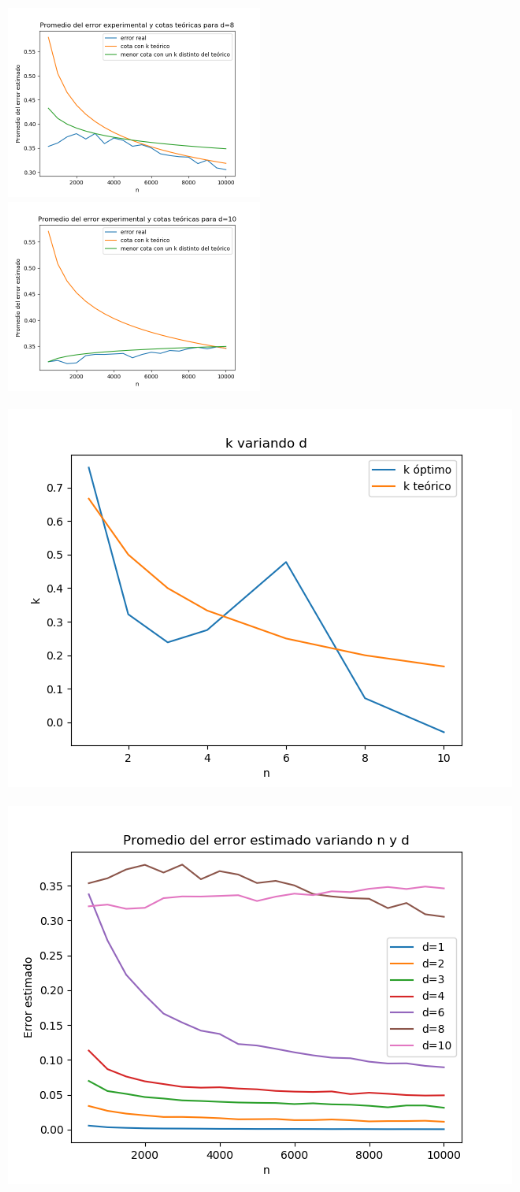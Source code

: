 \documentclass[12pt, a4paper]{article}
\begin{document}
\includegraphics[width=0.5\textwidth]{figuras_h_dinamico/cotas-error-d=8}
\includegraphics[width=0.5\textwidth]{figuras_h_dinamico/cotas-error-d=10}

\includegraphics[width=\textwidth]{figuras_h_dinamico/k-variando-d}

\includegraphics[width=\textwidth]{figuras_h_dinamico/resultados-grales}
\end{document}
